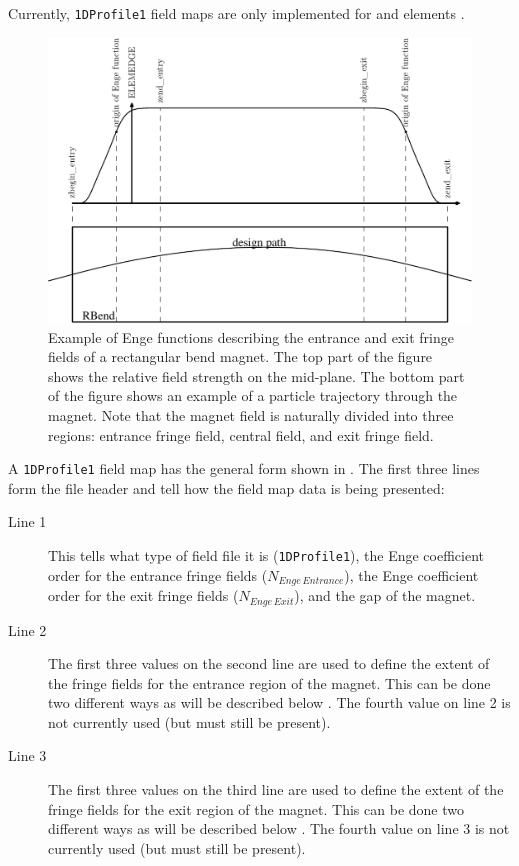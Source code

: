 Currently, \texttt{1DProfile1} field maps are only implemented for  and  elements .


\begin{figure}[tb]
\begin{center}
\includegraphics[width=\textwidth]{./figures/Fieldmaps/profile-1.pdf}
\end{center}
\caption{Example of Enge functions describing the entrance and exit fringe fields of a rectangular bend magnet. The top part of the figure shows the relative field strength on the mid-plane. The bottom part of the figure shows an example of a particle trajectory through the magnet. Note that the magnet field is naturally divided into three regions: entrance fringe field, central field, and exit fringe field.}
\label{fig:rbend_field_profile}
\end{figure}

\clearpage

A \texttt{1DProfile1} field map has the general form shown in . The first three lines form
the file header and tell \opalt how the field map data is being presented:

\begin{description}
\item[Line 1] This tells \opalt what type of field file it is (\texttt{1DProfile1}), the Enge coefficient order
  for the entrance fringe fields ($N_{Enge\,Entrance}$), the Enge coefficient order for the exit fringe fields
  ($N_{Enge\,Exit}$), and the gap of the magnet.
\item[Line 2] The first three values on the second line are used to define the extent of the fringe fields for the
  entrance region of the magnet. This can be done two different ways as will be described below .
  The fourth value on line 2 is not currently used (but must still be present).
\item[Line 3] The first three values on the third line are used to define the extent of the fringe fields for the
  exit region of the magnet. This can be done two different ways as will be described below .
  The fourth value on line 3 is not currently used (but must still be present).
\end{description}

